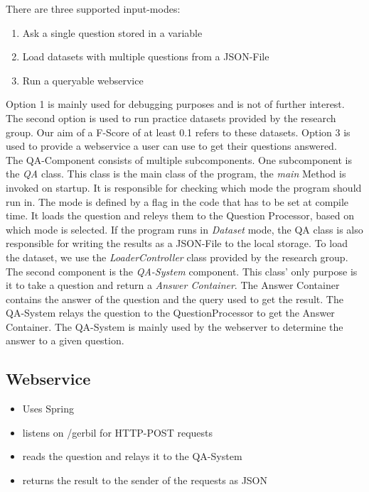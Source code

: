 \documentclass[runningheads]{llncs}
\begin{document}
There are three supported input-modes:  

\begin{enumerate}
	\item Ask a single question stored in a variable
	\item Load datasets with multiple questions from a JSON-File 
	\item Run a queryable webservice 
\end{enumerate}

Option 1 is mainly used for debugging purposes and is not of further interest. The second option is used to run practice datasets provided by the research group. Our aim of a F-Score of at least 0.1 refers to these datasets. Option 3 is used to provide a webservice a user can use to get their questions answered. \\

The QA-Component consists of multiple subcomponents. One subcomponent is the \emph{QA} class. This class is the main class of the program, the \emph{main} Method is invoked on startup. It is responsible for checking which mode the program should run in. The mode is defined by a flag in the code that has to be set at compile time. It loads the question and releys them to the Question Processor, based on which mode is selected. If the program runs in \emph{Dataset} mode, the QA class is also responsible for writing the results as a JSON-File to the local storage. To load the dataset, we use the \emph{LoaderController} class provided by the research group. \\

The second component is the \emph{QA-System} component. This class' only purpose is it to take a question and return a \emph{Answer Container}. The Answer Container contains the answer of the question and the query used to get the result. The QA-System relays the question to the QuestionProcessor to get the Answer Container. The QA-System is mainly used by the webserver to determine the answer to a given question. \\

\subsection{Webservice}

\begin{itemize}
	\item Uses Spring
	\item listens on /gerbil for HTTP-POST requests
	\item reads the question and relays it to the QA-System
	\item returns the result to the sender of the requests as JSON 
\end{itemize}
\end{document}
